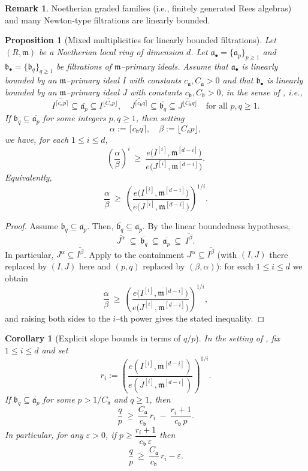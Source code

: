 \documentclass[12pt]{amsart}
\newcommand{\m}{\mathfrak m}
\renewcommand{\a}{\mathfrak{a}}
\renewcommand{\b}{\mathfrak{b}}
\newcommand{\abul}{{\a_\bullet}}
\newcommand{\bbul}{{\b_\bullet}}
\theoremstyle{plain}
\newtheorem{proposition}[theorem]{Proposition}
\newtheorem{corollary}[theorem]{Corollary}
\theoremstyle{definition}
\newtheorem{remark}[theorem]{Remark}
\numberwithin{equation}{section}
\begin{document}
\begin{remark}
Noetherian graded families (i.e.,  finitely generated Rees algebras) and many Newton-type
filtrations are linearly bounded.
\end{remark}

\begin{proposition}[Mixed multiplicities for linearly bounded filtrations]\label{prop:family-mixed}
Let $(R,\m)$ be a Noetherian local ring of dimension $d$.
Let $\abul=\{\a_p\}_{p\ge1}$ and $\bbul=\{\b_q\}_{q\ge1}$ be filtrations of $\m$--primary ideals.
Assume that $\abul$ is linearly bounded by an $\m$--primary ideal $I$ with constants $c_\a,C_\a>0$
and that $\bbul$ is linearly bounded by an $\m$--primary ideal $J$ with constants $c_\b,C_\b>0$,
in the sense of , i.e.,
\[
\overline{I^{\lceil c_\a p\rceil}}\subseteq \overline{\a_p}\subseteq \overline{I^{\lfloor C_\a p\rfloor}},
\quad
\overline{J^{\lceil c_\b q\rceil}}\subseteq \overline{\b_q}\subseteq \overline{J^{\lfloor C_\b q\rfloor}}
\quad \text{for all }p,q\ge1.
\]
If $\b_q\subseteq \overline{\a_p}$ for some integers $p,q\ge1$, then setting
\[
\alpha:=\lceil c_\b q\rceil,
\quad
\beta:=\lfloor C_\a p\rfloor,
\]
we have, for each $1\le i\le d$,
\[
\left(\frac{\alpha}{\beta}\right)^i
\ \ge\
\frac{e\bigl(I^{[i]},\m^{[d-i]}\bigr)}{e\bigl(J^{[i]},\m^{[d-i]}\bigr)}.
\]
Equivalently,
\[
\frac{\alpha}{\beta}\ \ge\
\left(\frac{e\bigl(I^{[i]},\m^{[d-i]}\bigr)}{e\bigl(J^{[i]},\m^{[d-i]}\bigr)}\right)^{1/i}.
\]
\end{proposition}

\begin{proof}
Assume $\b_q\subseteq \overline{\a_p}$. Then, $\overline{\b_q}\subseteq \overline{\a_p}$.
By the linear boundedness hypotheses,
\[
\overline{J^{\alpha}}
\ \subseteq\
\overline{\b_q}
\ \subseteq\
\overline{\a_p}
\ \subseteq\
\overline{I^{\beta}}.
\]
In particular, $J^{\alpha} \subseteq \overline{I^{\beta}}$.
Apply  to the containment $J^\alpha\subseteq \overline{I^\beta}$
(with $(I,J)$ there replaced by $(I,J)$ here and $(p,q)$ replaced by $(\beta,\alpha)$):
for each $1\le i\le d$ we obtain
\[
\frac{\alpha}{\beta}
\ \ge\
\left(\frac{e\bigl(I^{[i]},\m^{[d-i]}\bigr)}{e\bigl(J^{[i]},\m^{[d-i]}\bigr)}\right)^{1/i},
\]
and raising both sides to the $i$--th power gives the stated inequality.
\end{proof}

\begin{corollary}[Explicit slope bounds in terms of $q/p$]\label{cor:powerlike-slope-explicit}
In the setting of \Cref{prop:family-mixed}, fix $1\le i\le d$ and set
\[
r_i:=\left(\frac{e\!\left(I^{[i]},\m^{[d-i]}\right)}{e\!\left(J^{[i]},\m^{[d-i]}\right)}\right)^{\!1/i}.
\]
If $\b_q\subseteq \overline{\a_p}$ for some $p > 1/C_\a$ and $q \ge 1$, then
\begin{equation}\label{eq:explicit-q-over-p}
\frac{q}{p}\ \ge\ \frac{C_\a}{c_\b}\,r_i\ -\ \frac{r_i+1}{c_\b\,p}.
\end{equation}
In particular, for any $\varepsilon>0$, if $p\ge \dfrac{r_i+1}{c_\b\,\varepsilon}$ then
\[
\frac{q}{p}\ \ge\ \frac{C_\a}{c_\b}\,r_i-\varepsilon.
\]
\end{corollary}
\end{document}
